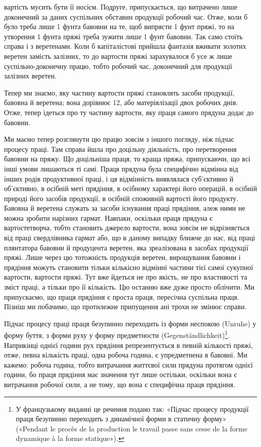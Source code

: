 \parcont{}  %
вартість мусить бути її носієм. Подруге, припускається, що витрачено
лише доконечний за даних суспільних обставин продукції
робочий час. Отже, коли б було треба лише 1 фунта бавовни
на те, щоб випрясти 1 фунт пряжі, то на утворення 1 фунта пряжі
треба зужити лише 1 фунт бавовни. Так само стоїть справа і з
веретенами. Коли б капіталістові прийшла фантазія вживати
золотих веретен замість залізних, то до вартости пряжі зарахувалося
б усе ж лише суспільно-доконечну працю, тобто робочий
час, доконечний для продукції залізних веретен.

Тепер ми знаємо, яку частину вартости пряжі становлять
засоби продукції, бавовна й веретена; вона дорівнює 12,
або матеріялізації двох робочих днів. Отже, тепер ідеться про
ту частину вартости, яку праця самого прядуна додає до бавовни.

Ми маємо тепер розглянути цю працю зовсім з іншого погляду,
ніж підчас процесу праці. Там справа йшла про доцільну діяльність,
про перетворення бавовни на пряжу. Що доцільніша праця,
то краща пряжа, припускаючи, що всі інші умови лишаються
ті самі. Праця прядуна була специфічно відмінна від інших
родів продуктивної праці, і ця відмінність виявлялася суб’єктивно
й об’єктивно, в осібній меті прядіння, в осібному характері його
операцій, в осібній природі його засобів продукції, в осібній споживній
вартості його продукту. Бавовна й веретена служать
за засоби існування праці прядіння, алеж ними не можна зробити
нарізних гармат. Навпаки, оскільки праця прядуна є вартостетворча,
тобто становить джерело вартости, вона зовсім не відрізняється
від праці свердлівника гармат або, що в даному випадку
ближче до нас, від праці плянтатора бавовни й продуцента
веретен, яка зреалізована в засобах продукції пряжі. Лише через
цю тотожність продукція веретен, вирощування бавовни і прядіння
можуть становити тільки кількісно відмінні частини тієї
самої сукупної вартости, вартости пряжі. Тут вже йдеться не
про якість, не про властивості та зміст праці, а тільки про її
кількість. Цю останню вже дуже просто облічити. Ми припускаємо,
що праця прядіння є проста праця, пересічна суспільна
праця. Пізніш ми побачимо, що протилежне припущення ані
трохи не змінює справи.

Підчас процесу праці праця безупинно переходить із форми
неспокою (Unruhe) у форму буття, з форми руху у форму предметности
(\textgerman{Gegenständlichkeit})\footnote*{
У французькому виданні це речення подано так: «Підчас
процесу продукції праця безупинно переходить з динамічної форми в статичну
форму» («Pendant le procès de la production le travail passe sans
cesse de la forme dynamique à la forme statique»). \Red{}
}. Наприкінці однієї години рух
прядіння репрезентується в певній кількості пряжі, отже, певна
кількість праці, одна робоча година, є упредметнена в бавовні.
Ми кажемо: робоча година, тобто витрачання життєвої сили прядуна
протягом однієї години, бо праця прядіння має значення
тут лише остільки, оскільки вона є витрачання робочої сили,
а не тому, що вона є специфічна праця прядіння.
